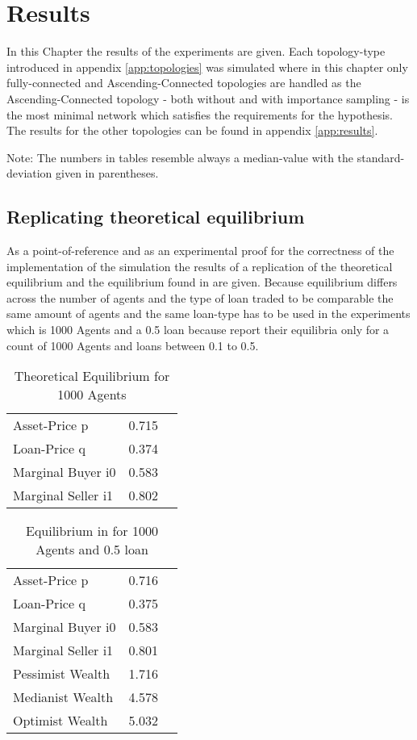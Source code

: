 \documentclass[Bachelorarbeit.tex]{subfiles}
\begin{document}
\graphicspath{{./figures/results/}}	%

\chapter{Results}
\label{ch:results}

In this Chapter the results of the experiments are given. Each topology-type introduced in appendix \ref{app:topologies} was simulated where in this chapter only fully-connected and Ascending-Connected topologies are handled as the Ascending-Connected topology - both without and with importance sampling - is the most minimal network which satisfies the requirements for the hypothesis. 
The results for the other topologies can be found in appendix \ref{app:results}.

Note: The numbers in tables resemble always a median-value with the standard-deviation given in parentheses.

\section{Replicating theoretical equilibrium}
As  a point-of-reference and as an experimental proof for the correctness of the implementation of the simulation the results of a replication of the theoretical equilibrium and the equilibrium found in \cite{Breuer2015} are given.
Because equilibrium differs across the number of agents and the type of loan traded to be comparable the same amount of agents and the same loan-type has to be used in the experiments which is 1000 Agents and a 0.5 loan because \cite{Breuer2015} report their equilibria only for a count of 1000 Agents and loans between 0.1 to 0.5.

\begin{table}[h]
	\centering
	\caption{Theoretical Equilibrium for 1000 Agents}
	\begin{tabular} { l c r }
		\hline
		Asset-Price p & 0.715 \\
		Loan-Price q & 0.374 \\
		Marginal Buyer i0 & 0.583 \\
		Marginal Seller i1 & 0.802 \\
		\hline
	\end{tabular}
\end{table}


\begin{table}[h]
	\centering
	\caption{Equilibrium in \cite{Breuer2015} for 1000 Agents and 0.5 loan }
	\begin{tabular} { l c r }
		\hline
		Asset-Price p & 0.716 \\
		Loan-Price q & 0.375 \\
		Marginal Buyer i0 & 0.583 \\
		Marginal Seller i1 & 0.801 \\
		Pessimist Wealth & 1.716 \\
		Medianist Wealth & 4.578 \\
		Optimist Wealth & 5.032 \\
		\hline
	\end{tabular}
\end{table}
\end{document}
